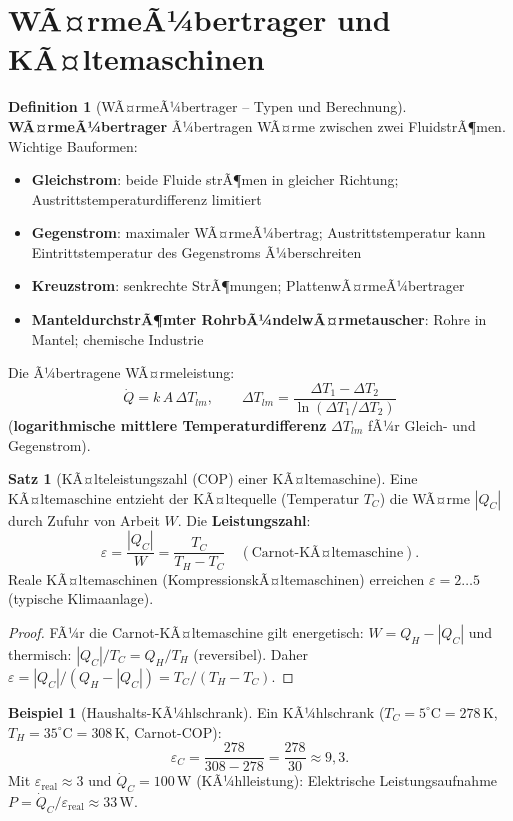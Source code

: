 ﻿\documentclass[a4paper,12pt]{report}
\theoremstyle{definition}
\newtheorem{definition}{Definition}
\newtheorem{beispiel}{Beispiel}
\newtheorem{satz}{Satz}
\begin{document}


\section{WÃ¤rmeÃ¼bertrager und KÃ¤ltemaschinen}

\begin{definition}[WÃ¤rmeÃ¼bertrager -- Typen und Berechnung]
\textbf{WÃ¤rmeÃ¼bertrager} Ã¼bertragen WÃ¤rme zwischen zwei FluidstrÃ¶men.
Wichtige Bauformen:
\begin{itemize}
    \item[-] \textbf{Gleichstrom}: beide Fluide strÃ¶men in gleicher Richtung;
          Austrittstemperaturdifferenz limitiert
    \item[-] \textbf{Gegenstrom}: maximaler WÃ¤rmeÃ¼bertrag; Austrittstemperatur
          kann Eintrittstemperatur des Gegenstroms Ã¼berschreiten
    \item[-] \textbf{Kreuzstrom}: senkrechte StrÃ¶mungen; PlattenwÃ¤rmeÃ¼bertrager
    \item[-] \textbf{ManteldurchstrÃ¶mter RohrbÃ¼ndelwÃ¤rmetauscher}:
          Rohre in Mantel; chemische Industrie
\end{itemize}
Die Ã¼bertragene WÃ¤rmeleistung:
\[
  \dot{Q} = k\,A\,\Delta T_{lm}, \qquad
  \Delta T_{lm} = \frac{\Delta T_1 - \Delta T_2}{\ln(\Delta T_1/\Delta T_2)}
\]
(\textbf{logarithmische mittlere Temperaturdifferenz} $\Delta T_{lm}$
fÃ¼r Gleich- und Gegenstrom).
\end{definition}

\begin{satz}[KÃ¤lteleistungszahl (COP) einer KÃ¤ltemaschine]
Eine KÃ¤ltemaschine entzieht der KÃ¤ltequelle (Temperatur $T_C$) die
WÃ¤rme $|Q_C|$ durch Zufuhr von Arbeit $W$.
Die \textbf{Leistungszahl}:
\[
  \varepsilon = \frac{|Q_C|}{W} = \frac{T_C}{T_H - T_C} \quad (\text{Carnot-KÃ¤ltemaschine}).
\]
Reale KÃ¤ltemaschinen (KompressionskÃ¤ltemaschinen) erreichen
$\varepsilon = 2\ldots5$ (typische Klimaanlage).
\end{satz}
\begin{proof}
FÃ¼r die Carnot-KÃ¤ltemaschine gilt energetisch: $W = Q_H - |Q_C|$
und thermisch: $|Q_C|/T_C = Q_H/T_H$ (reversibel).
Daher $\varepsilon = |Q_C|/(Q_H - |Q_C|) = T_C/(T_H - T_C)$.
\end{proof}

\begin{beispiel}[Haushalts-KÃ¼hlschrank]
Ein KÃ¼hlschrank ($T_C = 5^\circ\mathrm{C} = 278\,\mathrm{K}$,
$T_H = 35^\circ\mathrm{C} = 308\,\mathrm{K}$, Carnot-COP):
\[
  \varepsilon_C = \frac{278}{308 - 278} = \frac{278}{30} \approx 9{,}3.
\]
Mit $\varepsilon_{\text{real}} \approx 3$ und $\dot{Q}_C = 100\,\mathrm{W}$ (KÃ¼hlleistung):
Elektrische Leistungsaufnahme $P = \dot{Q}_C/\varepsilon_{\text{real}} \approx 33\,\mathrm{W}$.
\end{beispiel}
\end{document}

